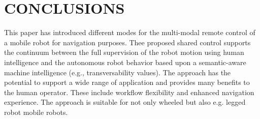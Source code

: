 \documentclass[letterpaper, 10 pt, conference]{ieeeconf}  %
\begin{document}
\section{CONCLUSIONS}
This paper has introduced different modes for the multi-modal remote control of a mobile robot for navigation purposes. Thee proposed shared control supports the continuum between the full supervision of the robot motion using human intelligence  and the autonomous robot behavior based upon a semantic-aware machine intelligence (e.g., transversability values). The approach has the potential to support a wide range of application and provides many benefits to the human operator. These include workflow flexibility and enhanced navigation experience. The approach is suitable for not only wheeled but also e.g. legged robot mobile robots.

\addtolength{\textheight}{-12cm}   %







\end{document}
